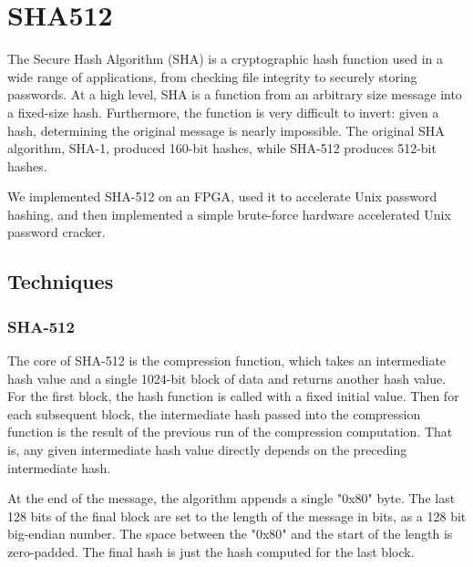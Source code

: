 \section{SHA512}
The Secure Hash Algorithm (SHA) is a cryptographic hash function used in a wide range of applications, from checking
file integrity to securely storing passwords.
At a high level, SHA is a function from an arbitrary size message into a fixed-size hash.
Furthermore, the function is very difficult to invert: given a hash, determining the original 
message is nearly impossible.
The original SHA algorithm, SHA-1, produced 160-bit hashes, while SHA-512
produces 512-bit hashes.

We implemented SHA-512 on an FPGA, used it to accelerate Unix password hashing, and then implemented
a simple brute-force hardware accelerated Unix password cracker.

\subsection{Techniques}
\subsubsection{SHA-512}
The core of SHA-512 is the compression function, which takes an intermediate hash value and a single 1024-bit
block of data and returns another hash value.
For the first block, the hash function is called with a fixed initial value. Then for each subsequent
block, the intermediate hash passed into the compression function is the result of the previous run of the
compression computation. That is, any given intermediate hash value directly depends on the preceding
intermediate hash.

At the end of the message, the algorithm appends a single "0x80" byte. The last 128 bits of the final block
are set to the length of the message in bits, as a 128 bit big-endian number. The space between the "0x80" and
the start of the length is zero-padded.
The final hash is just the hash computed for the last block.

